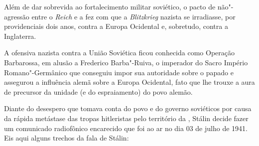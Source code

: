 Além de dar sobrevida ao fortalecimento militar soviético, o pacto de
não"-agressão entre o  \emph{Reich} e a  fez com que a
\emph{Blitzkrieg} nazista se irradiasse, por providenciais dois anos,
contra a Europa Ocidental e, sobretudo, contra a Inglaterra.

A ofensiva nazista contra a União Soviética ficou conhecida como
Operação Barbarossa, em alusão a Frederico Barba"-Ruiva, o imperador do
Sacro Império Romano"-Germânico que conseguiu impor sua autoridade sobre
o papado e assegurou a influência alemã sobre a Europa Ocidental, fato
que lhe trouxe a aura de precursor da unidade (e do espraiamento) do
povo alemão.

Diante do desespero que tomava conta do povo e do governo soviéticos por
causa da rápida metástase das tropas hitleristas pelo território da
, Stálin decide fazer um comunicado radiofônico encarecido que foi
ao ar no dia 03 de julho de 1941. Eis aqui alguns trechos da fala de
Stálin:

